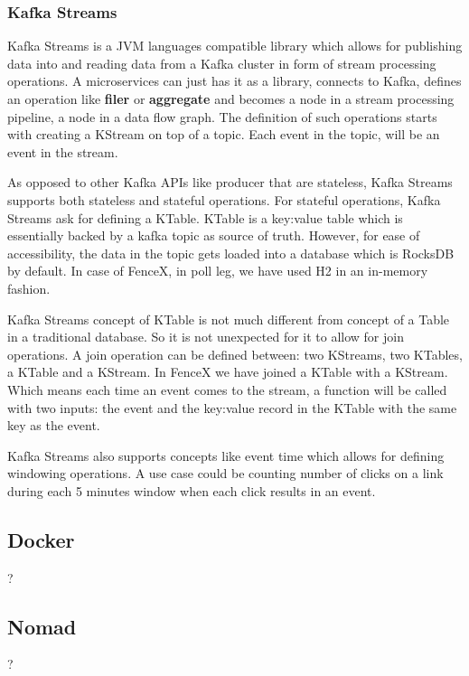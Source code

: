 \documentclass[a4]{report}
\begin{document}
    \subsubsection{Kafka Streams}
    Kafka Streams\cite{kafkaStreamsJoins} is a JVM languages compatible library which allows for publishing
    data into and reading data from a Kafka cluster in form of stream processing operations.
    A microservices can just has it as a library, connects to Kafka, defines an operation like \textbf{filer} or
    \textbf{aggregate} and becomes a node in a stream processing pipeline, a node in a data flow graph.
    The definition of such operations starts with creating a KStream on top of a topic.
    Each event in the topic, will be an event in the stream.

    As opposed to other Kafka APIs like producer that are stateless, Kafka Streams supports both stateless and
    stateful operations.
    For stateful operations, Kafka Streams ask for defining a KTable.
    KTable is a key:value table which is essentially backed by a kafka topic as source of truth.
    However, for ease of accessibility, the data in the topic gets loaded into a database which is RocksDB by default.
    In case of FenceX, in poll leg, we have used H2 in an in-memory fashion.

    Kafka Streams concept of KTable is not much different from concept of a Table in a traditional database.
    So it is not unexpected for it to allow for join operations.
    A join operation can be defined between: two KStreams, two KTables, a KTable and a KStream.
    In FenceX we have joined a KTable with a KStream.
    Which means each time an event comes to the stream, a function will be called with two inputs: the event and the
    key:value record in the KTable with the same key as the event.

    Kafka Streams also supports concepts like event time which allows for defining windowing operations.
    A use case could be counting number of clicks on a link during each 5 minutes window when each click results in
    an event.

    \subsection{Docker}
    ?

    \subsection{Nomad}
    ?
\end{document}
